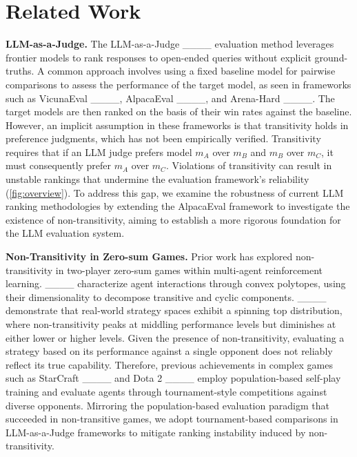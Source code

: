 \section{Related Work}
\textbf{LLM-as-a-Judge.}
The LLM-as-a-Judge ____ evaluation method leverages frontier models to rank responses to open-ended queries without explicit ground-truths. A common approach involves using a fixed baseline model for pairwise comparisons to assess the performance of the target model, as seen in frameworks such as VicunaEval ____, AlpacaEval ____, and Arena-Hard ____. The target models are then ranked on the basis of their win rates against the baseline. However, an implicit assumption in these frameworks is that transitivity holds in preference judgments, which has not been empirically verified. Transitivity requires that if an LLM judge prefers model $m_A$ over $m_B$ and $m_B$ over $m_C$, it must consequently prefer $m_A$ over $m_C$. Violations of transitivity can result in unstable rankings that undermine the evaluation framework's reliability (\cref{fig:overview}). To address this gap, we examine the robustness of current LLM ranking methodologies by extending the AlpacaEval framework to investigate the existence of non-transitivity, aiming to establish a more rigorous foundation for the LLM evaluation system.

\textbf{Non-Transitivity in Zero-sum Games.} Prior work has explored non-transitivity in two-player zero-sum games within multi-agent reinforcement learning. ____ characterize agent interactions through convex polytopes, using their dimensionality to decompose transitive and cyclic components. ____ demonstrate that real-world strategy spaces exhibit a spinning top distribution, where non-transitivity peaks at middling performance levels but diminishes at either lower or higher levels. Given the presence of non-transitivity, evaluating a strategy based on its performance against a single opponent does not reliably reflect its true capability. Therefore, previous achievements in complex games such as StarCraft ____ and Dota 2 ____ employ population-based self-play training and evaluate agents through tournament-style competitions against diverse opponents. Mirroring the population-based evaluation paradigm that succeeded in non-transitive games, we adopt tournament-based comparisons in LLM-as-a-Judge frameworks to mitigate ranking instability induced by non-transitivity.